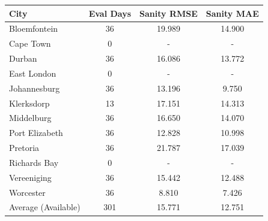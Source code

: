 \begin{tabular}{lccc}
\toprule
City & Eval Days & Sanity RMSE & Sanity MAE \\ \midrule
Bloemfontein & 36 & 19.989 & 14.900 \\
Cape Town & 0 & - & - \\
Durban & 36 & 16.086 & 13.772 \\
East London & 0 & - & - \\
Johannesburg & 36 & 13.196 & 9.750 \\
Klerksdorp & 13 & 17.151 & 14.313 \\
Middelburg & 36 & 16.650 & 14.070 \\
Port Elizabeth & 36 & 12.828 & 10.998 \\
Pretoria & 36 & 21.787 & 17.039 \\
Richards Bay & 0 & - & - \\
Vereeniging & 36 & 15.442 & 12.488 \\
Worcester & 36 & 8.810 & 7.426 \\
Average (Available) & 301 & 15.771 & 12.751 \\
\bottomrule
\end{tabular}
